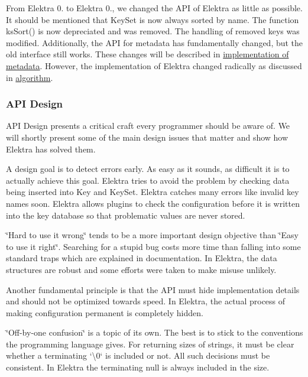From Elektra 0. to Elektra 0., we changed the A\+PI of Elektra as little as possible. It should be mentioned that {\ttfamily Key\+Set} is now always sorted by name. The function {\ttfamily ks\+Sort()} is now depreciated and was removed. The handling of removed keys was modified. Additionally, the A\+PI for metadata has fundamentally changed, but the old interface still works. These changes will be described in \hyperlink{doc_dev_metadata_md}{implementation of metadata}. However, the implementation of Elektra changed radically as discussed in \hyperlink{doc_dev_algorithm_md}{algorithm}.

\subsubsection*{A\+PI Design}

A\+PI Design presents a critical craft every programmer should be aware of. We will shortly present some of the main design issues that matter and show how Elektra has solved them.

A design goal is to detect errors early. As easy as it sounds, as difficult it is to actually achieve this goal. Elektra tries to avoid the problem by checking data being inserted into {\ttfamily Key} and {\ttfamily Key\+Set}. Elektra catches many errors like invalid key names soon. Elektra allows plugins to check the configuration before it is written into the key database so that problematic values are never stored.

\char`\"{}\+Hard to use it wrong\char`\"{} tends to be a more important design objective than \char`\"{}\+Easy to use it right\char`\"{}. Searching for a stupid bug costs more time than falling into some standard traps which are explained in documentation. In Elektra, the data structures are robust and some efforts were taken to make misuse unlikely.

Another fundamental principle is that the A\+PI must hide implementation details and should not be optimized towards speed. In Elektra, the actual process of making configuration permanent is completely hidden.

\char`\"{}\+Off-\/by-\/one confusion\char`\"{} is a topic of its own. The best is to stick to the conventions the programming language gives. For returning sizes of strings, it must be clear whether a terminating `\textquotesingle{}\textbackslash{}0\textquotesingle{}` is included or not. All such decisions must be consistent. In Elektra the terminating null is always included in the size.

